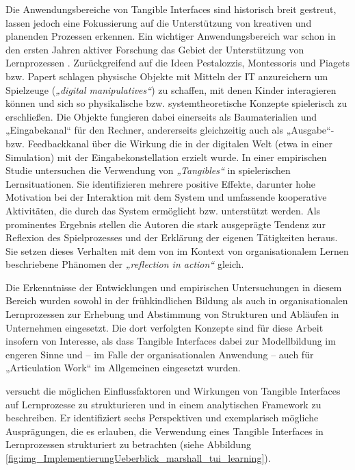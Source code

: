 Die Anwendungsbereiche von Tangible Interfaces sind historisch breit gestreut, lassen jedoch eine Fokussierung auf die Unterstützung von kreativen und planenden Prozessen erkennen. Ein wichtiger Anwendungsbereich war schon in den ersten Jahren aktiver Forschung das Gebiet der Unterstützung von Lernprozessen \citep{Resnick98}. Zurückgreifend auf die Ideen Pestalozzis, Montessoris \citep{Montessori05} und Piagets \citep{Piaget76} bzw. Papert \citep{Papert00} schlagen \citet{Resnick98} physische Objekte mit Mitteln der IT anzureichern um Spielzeuge (\emph{„digital manipulatives“}) zu schaffen, mit denen Kinder interagieren können und sich so physikalische bzw. systemtheoretische Konzepte spielerisch zu erschließen. Die Objekte fungieren dabei einerseits als Baumaterialien und „Eingabekanal“ für den Rechner, andererseits gleichzeitig auch als „Ausgabe“- bzw. Feedbackkanal über die Wirkung die in der digitalen Welt (etwa in einer Simulation) mit der Eingabekonstellation erzielt wurde. In einer empirischen Studie untersuchen \citet{Price03} die Verwendung von \emph{„Tangibles“} in spielerischen Lernsituationen. Sie identifizieren mehrere positive Effekte, darunter hohe Motivation bei der Interaktion mit dem System und umfassende kooperative Aktivitäten, die durch das System ermöglicht bzw. unterstützt werden. Als prominentes Ergebnis stellen die Autoren die stark ausgeprägte Tendenz zur Reflexion des Spielprozesses und der Erklärung der eigenen Tätigkeiten heraus. Sie setzen dieses Verhalten mit dem von \citet{Schon84} im Kontext von organisationalem Lernen beschriebene Phänomen der \emph{„reflection in action“} gleich. 

Die Erkenntnisse der Entwicklungen und empirischen Untersuchungen in diesem Bereich wurden sowohl in der frühkindlichen Bildung \citep{Zuckerman05} als auch in organisationalen Lernprozessen zur Erhebung und Abstimmung von Strukturen und Abläufen in Unternehmen \citep{Lego02} eingesetzt. Die dort verfolgten Konzepte sind für diese Arbeit insofern von Interesse, als dass Tangible Interfaces dabei zur Modellbildung im engeren Sinne und -- im Falle der organisationalen Anwendung -- auch für „Articulation Work“ im Allgemeinen eingesetzt wurden.

\citet{Marshall07} versucht die möglichen Einflussfaktoren und Wirkungen von Tangible Interfaces auf Lernprozesse zu strukturieren und in einem analytischen Framework zu beschreiben. Er identifiziert sechs Perspektiven und exemplarisch mögliche Ausprägungen, die es erlauben, die Verwendung eines Tangible Interfaces in Lernprozessen strukturiert zu betrachten (siehe Abbildung \ref{fig:img_ImplementierungUeberblick_marshall_tui_learning}). 

